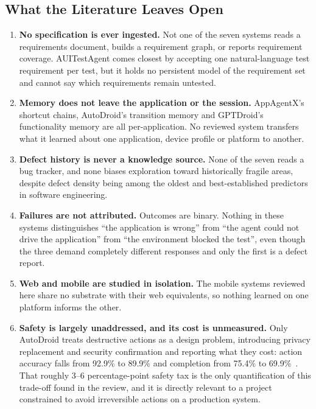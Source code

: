 \subsection{What the Literature Leaves Open}
\label{subsec:gaps}

\begin{enumerate}[label=\textbf{G\arabic*.},leftmargin=3.0em]
  \item \textbf{No specification is ever ingested.} Not one of the seven systems
    reads a requirements document, builds a requirement graph, or reports
    requirement coverage. AUITestAgent comes closest by accepting one
    natural-language test requirement per test, but it holds no persistent model
    of the requirement set and cannot say which requirements remain untested.
  \item \textbf{Memory does not leave the application or the session.}
    AppAgentX's shortcut chains, AutoDroid's transition memory and GPTDroid's
    functionality memory are all per-application. No reviewed system transfers
    what it learned about one application, device profile or platform to
    another.
  \item \textbf{Defect history is never a knowledge source.} None of the seven
    reads a bug tracker, and none biases exploration toward historically fragile areas, despite defect density being among the oldest and best-established
    predictors in software engineering.
  \item \textbf{Failures are not attributed.} Outcomes are binary. Nothing in
    these systems distinguishes ``the application is wrong'' from ``the agent
    could not drive the application'' from ``the environment blocked the test'',
    even though the three demand completely different responses and only the
    first is a defect report.
  \item \textbf{Web and mobile are studied in isolation.} The mobile systems
    reviewed here share no substrate with their web equivalents, so nothing
    learned on one platform informs the other.
  \item \textbf{Safety is largely unaddressed, and its cost is unmeasured.}
    Only AutoDroid treats destructive actions as a design problem, introducing
    privacy replacement and security confirmation and reporting what they cost:
    action accuracy falls from 92.9\% to 89.9\% and completion from 75.4\% to
    69.9\%~\cite{autodroid}. That roughly 3--6 percentage-point safety tax is the
    only quantification of this trade-off found in the review, and it is directly
    relevant to a project constrained to avoid irreversible actions on a
    production system.
\end{enumerate}

